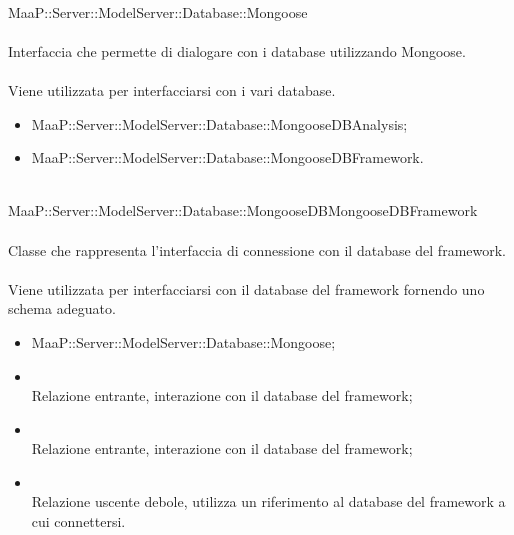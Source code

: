 \\
MaaP::Server::ModelServer::Database::Mongoose\\
\\
Interfaccia che permette di dialogare con i database utilizzando Mongoose.\\
\\
Viene utilizzata per interfacciarsi con i vari database.\\
\begin{itemize}
\item MaaP::Server::ModelServer::Database::MongooseDBAnalysis;
\item MaaP::Server::ModelServer::Database::MongooseDBFramework.
\end{itemize}

\\
MaaP::Server::ModelServer::Database::MongooseDBMongooseDBFramework\\
\\
Classe che rappresenta l'interfaccia di connessione con il database del framework.\\
\\
Viene utilizzata per interfacciarsi con il database del framework fornendo uno schema adeguato.\\
\begin{itemize}
\item MaaP::Server::ModelServer::Database::Mongoose;
\end{itemize}
\begin{itemize}
\item{}\\
Relazione entrante, interazione con il database del framework;
\item{}\\
Relazione entrante, interazione con il database del framework;
\item{}\\
Relazione uscente debole, utilizza un riferimento al database del framework a cui connettersi.
\end{itemize}


